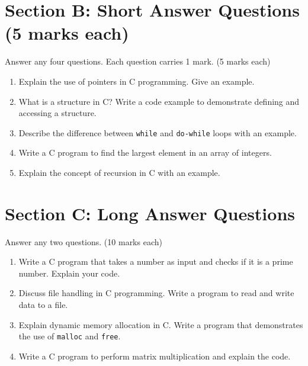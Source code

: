 \documentclass[12pt, a4paper]{article}
\begin{document}
\section*{Section B: Short Answer Questions (5 marks each)}
 
\flushleft Answer any four questions. Each question carries 1 mark.
\flushright(5 marks each) \\
\begin{enumerate}
    \item Explain the use of pointers in C programming. Give an example.
    \item What is a structure in C? Write a code example to demonstrate defining and accessing a structure.
    \item Describe the difference between \texttt{while} and \texttt{do-while} loops with an example.
    \item Write a C program to find the largest element in an array of integers.
    \item Explain the concept of recursion in C with an example.
   
\end{enumerate}


\section*{Section C: Long Answer Questions }
 
\flushleft Answer any two questions. 
\flushright(10 marks each) \\
\begin{enumerate}
    \item Write a C program that takes a number as input and checks if it is a prime number. Explain your code.
    \item Discuss file handling in C programming. Write a program to read and write data to a file.
    \item Explain dynamic memory allocation in C. Write a program that demonstrates the use of \texttt{malloc} and \texttt{free}.
    \item Write a C program to perform matrix multiplication and explain the code.
   
\end{enumerate}
\end{document}
